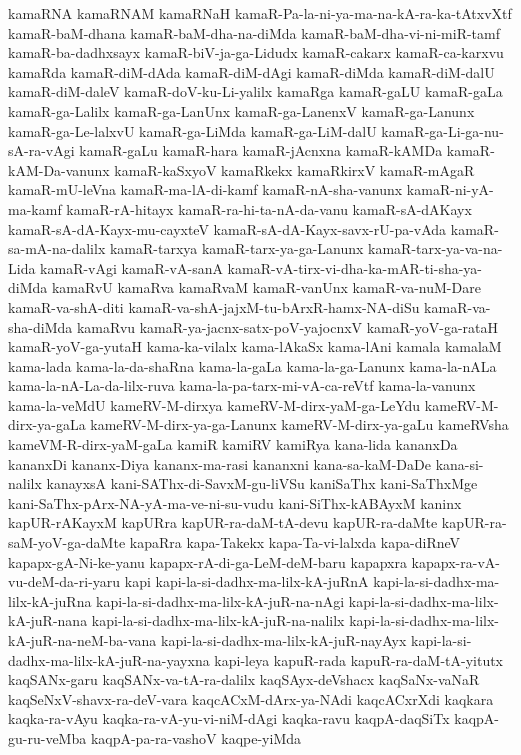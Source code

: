 {kamaRNA
kamaRNAM
kamaRNaH
kamaR-Pa-la-ni-ya-ma-na-kA-ra-ka-tAtxvXtf
kamaR-baM-dhana
kamaR-baM-dha-na-diMda
kamaR-baM-dha-vi-ni-miR-tamf
kamaR-ba-dadhxsayx
kamaR-biV-ja-ga-Lidudx
kamaR-cakarx
kamaR-ca-karxvu
kamaRda
kamaR-diM-dAda
kamaR-diM-dAgi
kamaR-diMda
kamaR-diM-dalU
kamaR-diM-daleV
kamaR-doV-ku-Li-yalilx
kamaRga
kamaR-gaLU
kamaR-gaLa
kamaR-ga-Lalilx
kamaR-ga-LanUnx
kamaR-ga-LanenxV
kamaR-ga-Lanunx
kamaR-ga-Le-lalxvU
kamaR-ga-LiMda
kamaR-ga-LiM-dalU
kamaR-ga-Li-ga-nu-sA-ra-vAgi
kamaR-gaLu
kamaR-hara
kamaR-jAcnxna
kamaR-kAMDa
kamaR-kAM-Da-vanunx
kamaR-kaSxyoV
kamaRkekx
kamaRkirxV
kamaR-mAgaR
kamaR-mU-leVna
kamaR-ma-lA-di-kamf
kamaR-nA-sha-vanunx
kamaR-ni-yA-ma-kamf
kamaR-rA-hitayx
kamaR-ra-hi-ta-nA-da-vanu
kamaR-sA-dAKayx
kamaR-sA-dA-Kayx-mu-cayxteV
kamaR-sA-dA-Kayx-savx-rU-pa-vAda
kamaR-sa-mA-na-dalilx
kamaR-tarxya
kamaR-tarx-ya-ga-Lanunx
kamaR-tarx-ya-va-na-Lida
kamaR-vAgi
kamaR-vA-sanA
kamaR-vA-tirx-vi-dha-ka-mAR-ti-sha-ya-diMda
kamaRvU
kamaRva
kamaRvaM
kamaR-vanUnx
kamaR-va-nuM-Dare
kamaR-va-shA-diti
kamaR-va-shA-jajxM-tu-bArxR-hamx-NA-diSu
kamaR-va-sha-diMda
kamaRvu
kamaR-ya-jacnx-satx-poV-yajocnxV
kamaR-yoV-ga-rataH
kamaR-yoV-ga-yutaH
kama-ka-vilalx
kama-lAkaSx
kama-lAni
kamala
kamalaM
kama-lada
kama-la-da-shaRna
kama-la-gaLa
kama-la-ga-Lanunx
kama-la-nALa
kama-la-nA-La-da-lilx-ruva
kama-la-pa-tarx-mi-vA-ca-reVtf
kama-la-vanunx
kama-la-veMdU
kameRV-M-dirxya
kameRV-M-dirx-yaM-ga-LeYdu
kameRV-M-dirx-ya-gaLa
kameRV-M-dirx-ya-ga-Lanunx
kameRV-M-dirx-ya-gaLu
kameRVsha
kameVM-R-dirx-yaM-gaLa
kamiR
kamiRV
kamiRya
kana-lida
kananxDa
kananxDi
kananx-Diya
kananx-ma-rasi
kananxni
kana-sa-kaM-DaDe
kana-si-nalilx
kanayxsA
kani-SAThx-di-SavxM-gu-liVSu
kaniSaThx
kani-SaThxMge
kani-SaThx-pArx-NA-yA-ma-ve-ni-su-vudu
kani-SiThx-kABAyxM
kaninx
kapUR-rAKayxM
kapURra
kapUR-ra-daM-tA-devu
kapUR-ra-daMte
kapUR-ra-saM-yoV-ga-daMte
kapaRra
kapa-Takekx
kapa-Ta-vi-lalxda
kapa-diRneV
kapapx-gA-Ni-ke-yanu
kapapx-rA-di-ga-LeM-deM-baru
kapapxra
kapapx-ra-vA-vu-deM-da-ri-yaru
kapi
kapi-la-si-dadhx-ma-lilx-kA-juRnA
kapi-la-si-dadhx-ma-lilx-kA-juRna
kapi-la-si-dadhx-ma-lilx-kA-juR-na-nAgi
kapi-la-si-dadhx-ma-lilx-kA-juR-nana
kapi-la-si-dadhx-ma-lilx-kA-juR-na-nalilx
kapi-la-si-dadhx-ma-lilx-kA-juR-na-neM-ba-vana
kapi-la-si-dadhx-ma-lilx-kA-juR-nayAyx
kapi-la-si-dadhx-ma-lilx-kA-juR-na-yayxna
kapi-leya
kapuR-rada
kapuR-ra-daM-tA-yitutx
kaqSANx-garu
kaqSANx-va-tA-ra-dalilx
kaqSAyx-deVshacx
kaqSaNx-vaNaR
kaqSeNxV-shavx-ra-deV-vara
kaqcACxM-dArx-ya-NAdi
kaqcACxrXdi
kaqkara
kaqka-ra-vAyu
kaqka-ra-vA-yu-vi-niM-dAgi
kaqka-ravu
kaqpA-daqSiTx
kaqpA-gu-ru-veMba
kaqpA-pa-ra-vashoV
kaqpe-yiMda
}
